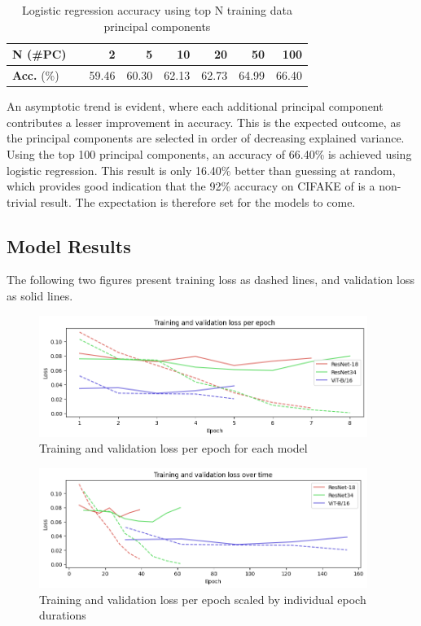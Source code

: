 \begin{table}[ht]
  \centering \small {}
  \caption{Logistic regression accuracy using top N training data principal components}
  \begin{tabular}{lcrrrrrr}
    \toprule
    \textbf{N} (\#PC)  & & 2     & 5     & 10    & 20    & 50    & 100 \\
    \midrule
    \textbf{Acc.} (\%) & & 59.46 & 60.30 & 62.13 & 62.73 & 64.99 & 66.40 \\
    \bottomrule
  \end{tabular}
  \label{tab:logistic_regression_benchmark}
\end{table}

An asymptotic trend is evident, where each additional principal component contributes a lesser improvement in accuracy. This is the expected outcome, as the principal components are selected in order of decreasing explained variance. Using the top 100 principal components, an accuracy of 66.40\% is achieved using logistic regression. This result is only 16.40\% better than guessing at random, which provides good indication that the 92\% accuracy on CIFAKE of \cite{bird_2023} is a non-trivial result. The expectation is therefore set for the models to come.

\subsection{Model Results}

The following two figures present training loss as dashed lines, and validation loss as solid lines.

\begin{figure}[!ht]
  \centering
  \includegraphics[width=0.95\textwidth]{images/q3_loss_per_epoch.png}
  \caption{Training and validation loss per epoch for each model}
  \label{fig:loss_per_epoch}
\end{figure}

\begin{figure}[!ht]
  \centering
  \includegraphics[width=0.95\textwidth]{images/q3_loss_per_time.png}
  \caption{Training and validation loss per epoch scaled by individual epoch durations}
  \label{fig:loss_per_time}
\end{figure}

